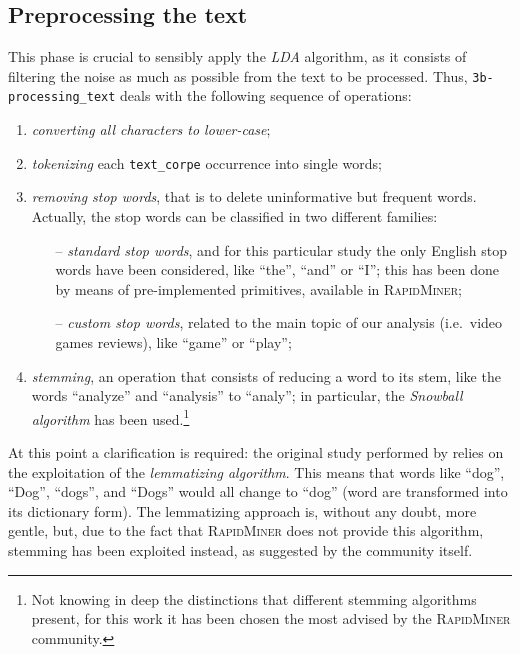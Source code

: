 \documentclass[a4paper]{article}
\begin{document}
	 	\subsection{Preprocessing the text}\label{subsec:processing-the-text}
	 		This phase is crucial to sensibly apply the \emph{LDA} algorithm, as it consists of filtering the noise as much as possible from the text to be processed. Thus, \verb*|3b-processing_text| deals with the following sequence of operations:
	 		\begin{enumerate}
	 			\item \emph{converting all characters to lower-case};
	 			\item \emph{tokenizing} each \verb*|text_corpe| occurrence into single words;
	 			\item \emph{removing stop words}, that is to delete uninformative but frequent words. Actually, the stop words can be classified in two different families:
	 			\begin{itemize}
	 				\item[--] \emph{standard stop words}, and for this particular study the only English stop words have been considered, like ``the'', ``and'' or ``I''; this has been done by means of pre-implemented primitives, available in \textsc{RapidMiner};
	 				\item[--] \emph{custom stop words}, related to the main topic of our analysis (i.e.~video games reviews), like ``game'' or ``play'';
	 			\end{itemize}
 				\item \emph{stemming}, an operation that consists of reducing a word to its stem, like the words ``analyze'' and ``analysis'' to ``analy''; in particular, the \emph{Snowball algorithm} has been used.\footnote{Not knowing in deep the distinctions that different stemming algorithms present, for this work it has been chosen the most advised by the \textsc{RapidMiner} community.}
	 		\end{enumerate}
 			At this point a clarification is required: the original study performed by \citeauthor{article:muller} relies on the exploitation of the \emph{lemmatizing algorithm}. This means that words like ``dog'', ``Dog'', ``dogs'', and ``Dogs'' would all change to ``dog'' (word are transformed into its dictionary form). The lemmatizing approach is, without any doubt, more gentle, but, due to the fact that \textsc{RapidMiner} does not provide this algorithm, stemming has been exploited instead, as suggested by the community itself. 
	 		
\end{document}
